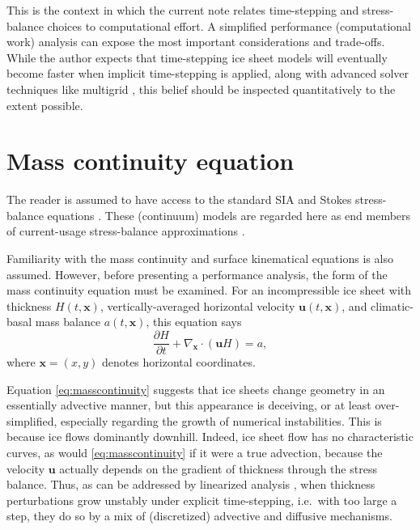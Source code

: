 \documentclass[twocolumn,letterpaper]{igs}
\newcommand\bu{\mathbf{u}}
\newcommand\bx{\mathbf{x}}
\newcommand{\Divx}{\nabla_\bx \cdot}
\begin{document}
This is the context in which the current note relates time-stepping and stress-balance choices to computational effort.  A simplified performance (computational work) analysis can expose the most important considerations and trade-offs.  While the author expects that time-stepping ice sheet models will eventually become faster when implicit time-stepping is applied, along with advanced solver techniques like multigrid \citep{Briggsetal2000}, this belief should be inspected quantitatively to the extent possible.


\section{Mass continuity equation}

The reader is assumed to have access to the standard SIA and Stokes stress-balance equations \citep{GreveBlatter2009,SchoofHewitt2013}.  These (continuum) models are regarded here as end members of current-usage stress-balance approximations \citep{Robinsonetal2022}.

Familiarity with the mass continuity and surface kinematical equations \citep{GreveBlatter2009} is also assumed.  However, before presenting a performance analysis, the form of the mass continuity equation must be examined.  For an incompressible ice sheet with thickness $H(t,\bx)$, vertically-averaged horizontal velocity $\bu(t,\bx)$, and climatic-basal mass balance $a(t,\bx)$, this equation says
\begin{equation}
\frac{\partial H}{\partial t} + \Divx \left(\bu H\right) = a, \label{eq:masscontinuity}
\end{equation}
where $\bx=(x,y)$ denotes horizontal coordinates.

Equation \eqref{eq:masscontinuity} suggests that ice sheets change geometry in an essentially advective manner, but this appearance is deceiving, or at least over-simplified, especially regarding the growth of numerical instabilities.  This is because ice flows dominantly downhill.  Indeed, ice sheet flow has no characteristic curves, as would \eqref{eq:masscontinuity} if it were a true advection, because the velocity $\bu$ actually depends on the gradient of thickness through the stress balance.  Thus, as can be addressed by linearized analysis \citep{Robinsonetal2022}, when thickness perturbations grow unstably under explicit time-stepping, i.e.~with too large a step, they do so by a mix of (discretized) advective and diffusive mechanisms.
\end{document}
